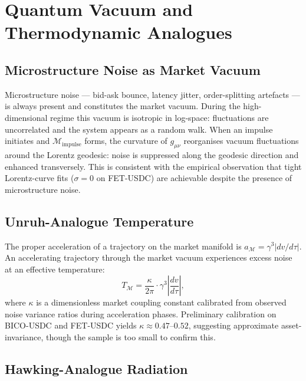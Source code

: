 \documentclass[12pt,a4paper]{article}
\begin{document}

\section{Quantum Vacuum and Thermodynamic Analogues}

\subsection{Microstructure Noise as Market Vacuum}

Microstructure noise --- bid-ask bounce, latency jitter, order-splitting
artefacts --- is always present and constitutes the market vacuum. During
the high-dimensional regime this vacuum is isotropic in log-space:
fluctuations are uncorrelated and the system appears as a random walk.
When an impulse initiates and $\mathcal{M}_{\text{impulse}}$ forms, the
curvature of $g_{\mu\nu}$ reorganises vacuum fluctuations around the
Lorentz geodesic: noise is suppressed along the geodesic direction and
enhanced transversely. This is consistent with the empirical observation
that tight Lorentz-curve fits ($\sigma=0$ on FET-USDC) are achievable
despite the presence of microstructure noise.

\subsection{Unruh-Analogue Temperature}

The proper acceleration of a trajectory on the market manifold is
$a_\mathcal{M} = \gamma^3|dv/d\tau|$. An accelerating trajectory through
the market vacuum experiences excess noise at an effective temperature:
\begin{equation}
    T_\mathcal{M} = \frac{\kappa}{2\pi}\cdot\gamma^3\left|\frac{dv}{d\tau}\right|,
\end{equation}
where $\kappa$ is a dimensionless market coupling constant calibrated from
observed noise variance ratios during acceleration phases. Preliminary
calibration on BICO-USDC and FET-USDC yields $\kappa\approx0.47$--$0.52$,
suggesting approximate asset-invariance, though the sample is too small to
confirm this.

\subsection{Hawking-Analogue Radiation}
\end{document}
